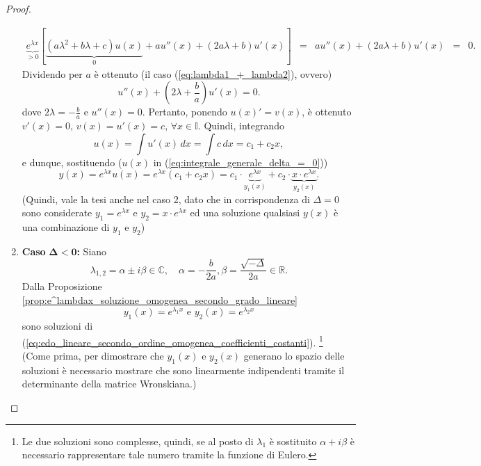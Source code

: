 \begin{proof}
\begin{enumerate}
\begin{equation*}
\begin{matrix}
				\underbrace{e^{\lambda x}}_{>0} [\underbrace{(a\lambda^2+b\lambda +c) u(x)}_{0} + a u''(x)+(2a\lambda + b)u'(x)] &=& a u''(x)+(2a\lambda + b)u'(x) &=& 0.
			\end{matrix}
		\end{equation*}
		Dividendo per $a$ è ottenuto (il caso (\ref{eq:lambda1_+_lambda2}), ovvero)
		\begin{equation*}
			u''(x)+\left(2\lambda + \frac{b}{a}\right)u'(x)=0.
		\end{equation*}
		dove $2\lambda = -\frac{b}{a}$ e $u''(x)=0$.
		Pertanto, ponendo $u(x)'=v(x)$, è ottenuto $v'(x)=0,\,v(x)=u'(x)=c,\,\forall x\in\mathbb{I}$. Quindi, integrando
		\begin{equation*}
			u(x) = \int u'(x)\,dx = \int c\, dx =  c_1+c_2 x,
		\end{equation*}
		e dunque, sostituendo ($u(x)$ in (\ref{eq:integrale_generale_delta_=_0}))
		\begin{equation*}
			y(x) = e^{\lambda x}u(x) = e^{\lambda x} (c_1+c_2x) = c_1\cdot \underbrace{e^{\lambda x}}_{y_1(x)} + c_2\cdot\underbrace{x\cdot e^{\lambda x}}_{y_2(x)}.
		\end{equation*}
		(Quindi, vale la tesi anche nel caso 2, dato che in corrispondenza di $\Delta=0$ sono considerate $y_1=e^{\lambda x}$ e $y_2=x\cdot e^{\lambda x}$ ed una soluzione qualsiasi $y(x)$ è una combinazione di $y_1$ e $y_2$)
		\item \textbf{Caso} $\boldsymbol{\Delta<0}$\textbf{:} Siano
		\begin{equation*}
			\lambda_{1,2}=\alpha\pm i\beta\in\mathbb{C},\quad \alpha=-\frac{b}{2a},\beta = \frac{\sqrt{-\Delta}}{2a}\in\mathbb{R}.
		\end{equation*}
		Dalla Proposizione \ref{prop:e^lambdax_soluzione_omogenea_secondo_grado_lineare}
		\begin{equation*}
			y_1(x) = e^{\lambda_1 x} \text{ e } y_2(x)=e^{\lambda_2 x}
		\end{equation*}
		sono soluzioni di (\ref{eq:edo_lineare_secondo_ordine_omogenea_coefficienti_costanti}). \footnote{Le due soluzioni sono complesse, quindi, se al posto di $\lambda_1$ è sostituito $\alpha + i\beta$ è necessario rappresentare tale numero tramite la funzione di Eulero.}\\
		(Come prima, per dimostrare che $y_1(x) \text{ e } y_2(x)$ generano lo spazio delle soluzioni è necessario mostrare che sono linearmente indipendenti tramite il determinante della matrice Wronskiana.)
		

\end{enumerate}
\end{proof}
